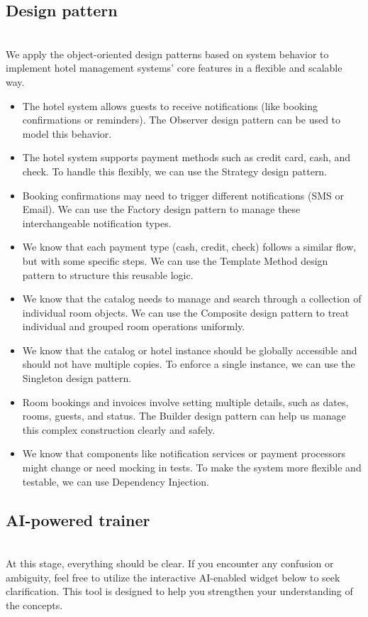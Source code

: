 \subsection{Design pattern}\label{e7G5uP-M0EJ1LWs4-Q-Vo}
\\
We apply the object-oriented design patterns based on system behavior to implement hotel management systems' core features in a flexible and scalable way.

\begin{itemize}
\item
The hotel system allows guests to receive notifications (like booking confirmations or reminders). The Observer design pattern can be used to model this behavior.
\item
The hotel system supports payment methods such as credit card, cash, and check. To handle this flexibly, we can use the Strategy design pattern.
\item
Booking confirmations may need to trigger different notifications (SMS or Email). We can use the Factory design pattern to manage these interchangeable notification types.
\item
We know that each payment type (cash, credit, check) follows a similar flow, but with some specific steps. We can use the Template Method design pattern to structure this reusable logic.
\item
We know that the catalog needs to manage and search through a collection of individual room objects. We can use the Composite design pattern to treat individual and grouped room operations uniformly.
\item
We know that the catalog or hotel instance should be globally accessible and should not have multiple copies. To enforce a single instance, we can use the Singleton design pattern.
\item
Room bookings and invoices involve setting multiple details, such as dates, rooms, guests, and status. The Builder design pattern can help us manage this complex construction clearly and safely.
\item
We know that components like notification services or payment processors might change or need mocking in tests. To make the system more flexible and testable, we can use Dependency Injection.
\end{itemize}

\subsection{AI-powered trainer}\label{5h3Jmj2lqIsj4A2I8nvPM}
\\
At this stage, everything should be clear. If you encounter any confusion or ambiguity, feel free to utilize the interactive AI-enabled widget below to seek clarification. This tool is designed to help you strengthen your understanding of the concepts.

